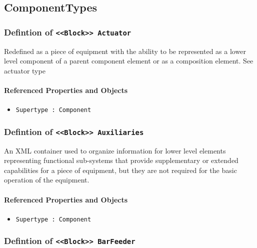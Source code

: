 \subsection{ComponentTypes} \label{model:ComponentTypes}
\subsubsection{Defintion of \texttt{<<Block>> Actuator}}
  \label{type:Actuator}

\FloatBarrier

Redefined as a piece of equipment with the ability to be represented as a lower level component of a parent component element or as a composition element. See actuator type

\FloatBarrier
\paragraph{Referenced Properties and Objects}

\begin{itemize}
\item \texttt{Supertype : Component}

\end{itemize}
\FloatBarrier
\subsubsection{Defintion of \texttt{<<Block>> Auxiliaries}}
  \label{type:Auxiliaries}

\FloatBarrier

An XML container used to organize information for lower level elements representing functional sub-systems that provide supplementary or extended capabilities for a piece of equipment, but they are not required for the basic operation of the equipment.

\FloatBarrier
\paragraph{Referenced Properties and Objects}

\begin{itemize}
\item \texttt{Supertype : Component}

\end{itemize}
\FloatBarrier
\subsubsection{Defintion of \texttt{<<Block>> BarFeeder}}
  \label{type:BarFeeder}

